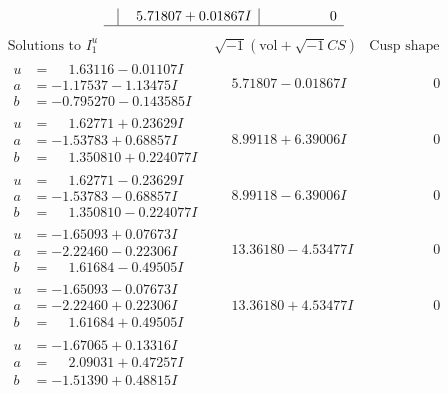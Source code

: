 \documentclass[1p]{elsarticle_modified}
\theoremstyle{definition}
\newcommand{\I}{\sqrt{-1}}
\begin{document}
$$\begin{array}{c|c|c}
 & \phantom{-}5.71807 + 0.01867 I & \phantom{-0.000000 } 0\\
 \hline 
 \end{array}$$\newpage$$\begin{array}{c|c|c}  
\text{Solutions to }I^u_{1}& \I (\text{vol} + \sqrt{-1}CS) & \text{Cusp shape}\\
 \hline 
\begin{aligned}
u &= \phantom{-}1.63116 - 0.01107 I \\
a &= -1.17537 - 1.13475 I \\
b &= -0.795270 - 0.143585 I\end{aligned}
 & \phantom{-}5.71807 - 0.01867 I & \phantom{-0.000000 } 0 \\ \hline\begin{aligned}
u &= \phantom{-}1.62771 + 0.23629 I \\
a &= -1.53783 + 0.68857 I \\
b &= \phantom{-}1.350810 + 0.224077 I\end{aligned}
 & \phantom{-}8.99118 + 6.39006 I & \phantom{-0.000000 } 0 \\ \hline\begin{aligned}
u &= \phantom{-}1.62771 - 0.23629 I \\
a &= -1.53783 - 0.68857 I \\
b &= \phantom{-}1.350810 - 0.224077 I\end{aligned}
 & \phantom{-}8.99118 - 6.39006 I & \phantom{-0.000000 } 0 \\ \hline\begin{aligned}
u &= -1.65093 + 0.07673 I \\
a &= -2.22460 - 0.22306 I \\
b &= \phantom{-}1.61684 - 0.49505 I\end{aligned}
 & \phantom{-}13.36180 - 4.53477 I & \phantom{-0.000000 } 0 \\ \hline\begin{aligned}
u &= -1.65093 - 0.07673 I \\
a &= -2.22460 + 0.22306 I \\
b &= \phantom{-}1.61684 + 0.49505 I\end{aligned}
 & \phantom{-}13.36180 + 4.53477 I & \phantom{-0.000000 } 0 \\ \hline\begin{aligned}
u &= -1.67065 + 0.13316 I \\
a &= \phantom{-}2.09031 + 0.47257 I \\
b &= -1.51390 + 0.48815 I\end{aligned}

\end{array}$$
\end{document}
